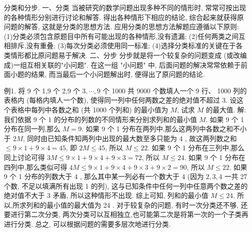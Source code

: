 
分类和分步.
一、分类
当被研究的数学问题出现多种不同的情形时, 常常可按出现的各种情形分别进行讨论和解答.
得出各种情形下相应的结论, 综合起来就获得原问题的解答, 这就是分类的思想方法.
应用分类的思想方法解题应遵循以下原则:
(1)分类必须包含原题目中所有可能出现的各种情形,没有遗漏;
(2)任何两类之间互相排斥,没有重叠;
(3)每次分类必须使用同一标准;
(4)选择分类标准的关键在于各类情形都比原问题易于解决.
二、分步
分步就是将一个较复杂的问题变成 (或改编成)一组互相关联的"小问题". 在这一组 "小问题" 中, 后面问题的解决常常依赖于前面小题的结果, 而当最后一个小问题解出时, 便得出了原问题的结论.



例1. 将 9 个 1,9 个 2,9 个 $3, \cdots, 9$ 个 1000 共 9000 个数填人一个 9 行、 1000 列的表格内 (每格内填人一个数), 使得同一列中任何两数之差的绝对值不超过 3. 设这个表格中每列中各数之和 (共 1000 个列和) 的最小值为 $M$, 试求 $M$ 的最大值.
解:我们依据 9 个 1 的分布的列数的不同情形来分别求列和的最小值 $M$.
如果 9 个 1 分布在同一列,那么 $M=9$.
如果 9 个 1 分布在两列中,那么这两列中各数之和不小于 $2 M$, 同时由已知条件知两列中出现的最大数至多只能为 4 , 故这两列数之和 $\leqslant 9 \times 1+9 \times 4=45$, 即 $2 M \leqslant 45$, 所以 $M \leqslant 22$.
如果 9 个 1 分布在三列中,那么同上讨论可得 $3 M \leqslant 9 \times 1+9 \times 4+9 \times 3=72$, 所以 $M \leqslant 24$.
如果 9 个 1 分布在四列中,那么类似可得 $4 M \leqslant 9 \times 1+9 \times 4+9 \times 3+ 9 \times 2=90$, 所以 $M \leqslant 22$.
如果 9 个 1 分布的列数大于 4 , 那么其中某一列必有一个数大于 4 (因为
$2,3,4$ 一共 27 个数, 不足以填满所有出现 1 的列), 这与已知条件中任何一列中任意两个数之差的绝对值不大于 3 矛盾, 所以这种情形不出现.
综上可知, 列和的最小值 $M \leqslant 24$.
所以,所求列和的最小值的最大值为 24 .
对于较复杂的问题, 有时一次分类还不够, 还要进行第二次分类, 两次分类可以互相独立,也可能第二次是将第一次的一个子类再进行分类.
总之, 可以根据问题的需要多层次地进行分类.



